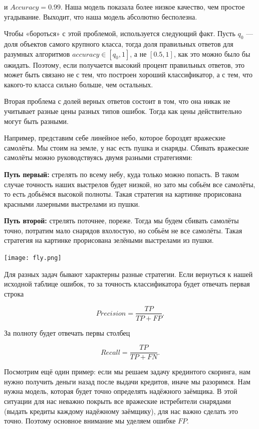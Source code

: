 \documentclass[12pt, a4paper, oneside]{article}
\begin{document}
\begin{enumerate}
		и $Accuracy = 0.99$. Наша модель показала более низкое качество, чем простое угадывание. Выходит, что наша модель абсолютно бесполезна. 
		
		Чтобы «бороться» с этой проблемой, используется следующий факт. Пусть $q_0$ — доля объектов самого крупного класса, тогда доля правильных ответов для разумных алгоритмов $accuracy \in [q_0,1]$, а не $[0.5, 1]$, как это можно было бы ожидать. Поэтому, если получается высокий процент правильных ответов, это может быть связано не с тем, что построен хороший классификатор, а с тем, что какого-то класса сильно больше, чем остальных.
		
		Вторая проблема с долей верных ответов состоит в том, что она никак не учитывает разные цены разных типов ошибок. Тогда как цены действительно могут быть разными.
		
		Например, представим себе линейное небо, которое бороздят вражеские самолёты. Мы стоим на земле, у нас есть пушка и снаряды. Сбивать вражеские самолёты можно руководствуясь двумя разными стратегиями: 
		
		\textbf{Путь первый:}  стрелять по всему небу, куда только можно попасть. В таком случае точность наших выстрелов будет низкой, но зато мы собьём все самолёты, то есть добьёмся высокой полноты. Такая стратегия на картинке прорисована красными лазерными выстрелами из пушки.
		
		\textbf{Путь второй:} стрелять поточнее, пореже. Тогда мы будем сбивать самолёты точно, потратим мало снарядов вхолостую, но собьём не все самолёты. Такая стратегия на картинке прорисована зелёными выстрелами из пушки. 
		
		\begin{center}
			\texttt{[image: fly.png]}
		\end{center}
		
		
		Для разных задач бывают характерны разные стратегии. Если вернуться к нашей исходной таблице ошибок, то за точность классификатора будет отвечать первая строка
		
		\[ 
		Precision = \frac{TP}{TP + FP}.
		\]
		
		За полноту будет отвечать первы столбец
		
		\[Recall = \frac{TP}{TP + FN}.\]
		
		Посмотрим ещё один пример: если мы решаем задачу крединтого скоринга, нам нужно получить деньги назад после выдачи кредитов, иначе мы разоримся. Нам нужна модель, которая будет точно определять надёжного заёмщика. В этой ситуации для нас неважно покрыть все вражеские истребители снарядами (выдать кредиты каждому надёжному заёмщику), для нас важно сделать это точно. Поэтому основное внимание мы уделяем ошибке $FP$. 
		

\end{enumerate}
\end{document}
